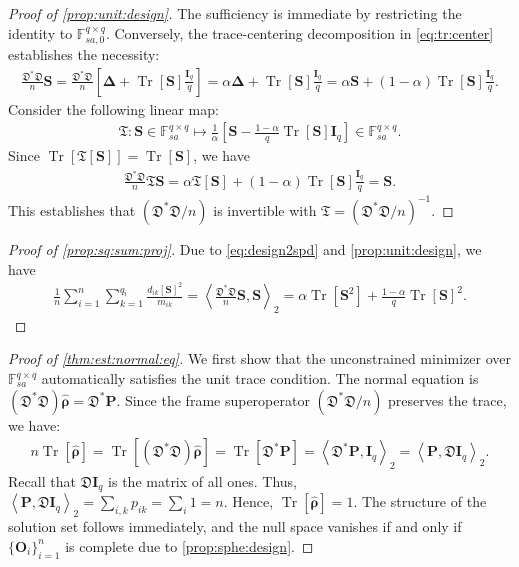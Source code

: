 \documentclass[noinfoline]{imsart}\setcounter{tocdepth}{2}
\renewcommand{\b}[1]{\mathbb{#1}} %
\newcommand{\m}[1]{\mathbf{#1}} %
\newcommand{\f}[1]{\mathfrak{#1}} %
\newcommand{\mb}[1]{\boldsymbol{#1}} %
\newcommand{\tr}[1]{\operatorname{Tr}\left[#1\right]}
\newcommand{\innpr}[2]{{\left\langle {#1},{#2}\right\rangle}} %
\theoremstyle{plain}
\begin{document}
\begin{appendix}
\begin{proof}[Proof of \cref{prop:unit:design}]
The sufficiency is immediate by restricting the identity to $\b{F}_{sa, 0}^{q \times q}$. Conversely, the trace-centering decomposition in \eqref{eq:tr:center} establishes the necessity:
\begin{align*}
    \frac{\f{D}^{*} \f{D}}{n} \m{S} = \frac{\f{D}^{*} \f{D}}{n} \left[\mb{\Delta} + \tr{\m{S}} \frac{\m{I}_{q}}{q}  \right] = \alpha \mb{\Delta} + \tr{\m{S}} \frac{\m{I}_{q}}{q} = \alpha \m{S} + (1-\alpha) \tr{\m{S}} \frac{\m{I}_{q}}{q}.
\end{align*}
Consider the following linear map:
\begin{align*}
    \f{T}: \m{S} \in \b{F}_{sa}^{q \times q} \mapsto \frac{1}{\alpha} \left[ \m{S} - \frac{1-\alpha}{q} \tr{\m{S}} \m{I}_{q} \right] \in \b{F}_{sa}^{q \times q}.
\end{align*}
Since $\tr{\f{T} [\m{S}]} = \tr{\m{S}}$, we have
\begin{align*}
    \frac{\f{D}^{*} \f{D}}{n} \f{T} \m{S} = \alpha \f{T} [\m{S}] + (1-\alpha) \tr{\m{S}} \frac{\m{I}_{q}}{q} 
    = \m{S}.
\end{align*}
This establishes that $(\f{D}^{*} \f{D}/n)$ is invertible with $\f{T} = (\f{D}^{*} \f{D}/n)^{-1}$.
\end{proof}


\begin{proof}[Proof of \cref{prop:sq:sum:proj}]
Due to \eqref{eq:design2spd} and \cref{prop:unit:design}, we have
\begin{align*}  
    \frac{1}{n} \sum_{i=1}^{n} \sum_{k=1}^{q_{i}} \frac{d_{ik}[\m{S}]^{2}}{m_{ik}} = \innpr{\frac{\f{D}^{*} \f{D}}{n} \m{S}}{\m{S}}_{2}
    = \alpha \tr{\m{S}^{2}} + \frac{1-\alpha}{q} \tr{\m{S}}^{2}.
\end{align*}
\end{proof}

\begin{proof}[Proof of \cref{thm:est:normal:eq}]
We first show that the unconstrained minimizer over $\b{F}_{sa}^{q \times q}$ automatically satisfies the unit trace condition. The normal equation is $(\f{D}^{*} \f{D}) \hat{\mb{\rho}} = \f{D}^{*} \m{P}$. Since the frame superoperator $(\f{D}^{*} \f{D}/n)$ preserves the trace, we have:
\begin{align*}
    n \tr{\hat{\mb{\rho}}} = \tr{(\f{D}^{*} \f{D}) \hat{\mb{\rho}}} = \tr{\f{D}^{*} \m{P}} = \innpr{\f{D}^{*} \m{P}}{\m{I}_{q}}_{2} = \innpr{\m{P}}{\f{D} \m{I}_{q}}_{2}.
\end{align*}
Recall that $\f{D}\m{I}_q$ is the matrix of all ones. Thus, $\innpr{\m{P}}{\f{D} \m{I}_{q}}_{2} = \sum_{i,k} p_{ik} = \sum_i 1 = n$. Hence, $\tr{\hat{\mb{\rho}}} = 1$.
The structure of the solution set follows immediately, and the null space vanishes if and only if $\{\m{O}_{i}\}_{i=1}^{n}$ is complete due to \cref{prop:sphe:design}.
\end{proof}


\end{appendix}
\end{document}
